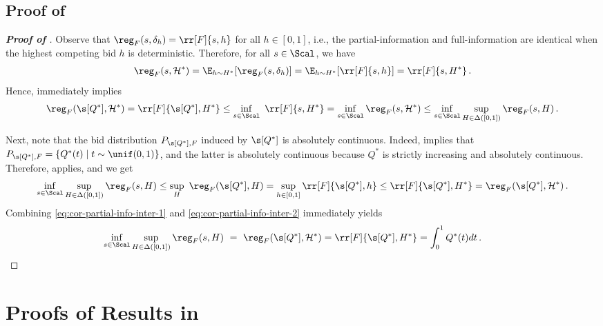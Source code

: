 \subsection{Proof of }

\begin{proof}[\textbf{Proof of }]
	Observe that $\reg_F(s, \delta_h) = \rr[F]{s,h}$ for all $h \in [0,1]$, i.e., the partial-information and full-information are identical when the highest competing bid $h$ is deterministic. Therefore, for all $s \in \Scal$, we have
	\begin{align*}
		\reg_F(s, \mathcal H^*) = \E_{h \sim H^*}[\reg_F(s, \delta_h)] = \E_{h \sim H^*}[\rr[F]{s, h}] = \rr[F]{s, H^*}\,.
	\end{align*}
	Hence,  immediately implies
	\begin{align}\label{eq:cor-partial-info-inter-1}
		\reg_F(\s[Q^*], \mathcal H^*) = \rr[F]{\s[Q^*], H^*} \leq \inf_{s \in \Scal}\ \rr[F]{s, H^*} = \inf_{s \in \Scal} \reg_F(s, \mathcal H^*) \leq  \inf_{s \in \Scal} \sup_{H \in \Delta([0,1])} \reg_F(s, H)\,.
	\end{align}
	
	Next, note that the bid distribution $P_{\s[Q^*], F}$ induced by $\s[Q^*]$ is absolutely continuous. Indeed,  implies that $P_{\s[Q^*], F} = \{Q^*(t) \mid t \sim \unif(0,1)\}$, and the latter is absolutely continuous because $Q^*$ is strictly increasing and absolutely continuous. Therefore,  applies, and we get
	\begin{align}\label{eq:cor-partial-info-inter-2}
		\inf_{s \in \Scal} \sup_{H \in \Delta([0,1])} \reg_F(s, H) \leq \sup_{H}\ \reg_F(\s[Q^*], H) = \sup_{h \in [0,1]} \rr[F]{\s[Q^*], h} \leq \rr[F]{\s[Q^*], H^*} = \reg_F(\s[Q^*], \mathcal H^*)\,.
	\end{align}
    Combining \eqref{eq:cor-partial-info-inter-1} and \eqref{eq:cor-partial-info-inter-2} immediately yields
    \begin{align*}
        \inf_{s \in \Scal} \sup_{H \in \Delta([0,1])} \reg_F(s, H)\ =\ \reg_F(\s[Q^*], \mathcal H^*) = \rr[F]{\s[Q^*], H^*} = \int_0^1 Q^*(t)dt\,. \qquad \qedhere
    \end{align*}
\end{proof}

\section{Proofs of Results in }

